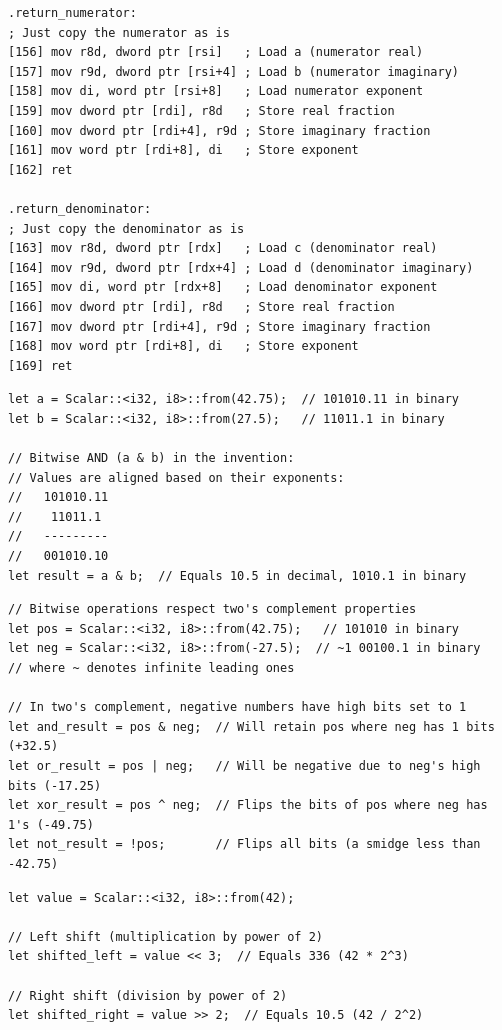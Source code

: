 \documentclass[12pt,letter]{article}
\begin{document}
\begin{lstlisting}[style=rust, caption={Complete Complex Division Assembly Implementation}, label={fig:circle_divide}]
.return_numerator:
; Just copy the numerator as is
[156] mov r8d, dword ptr [rsi]   ; Load a (numerator real)
[157] mov r9d, dword ptr [rsi+4] ; Load b (numerator imaginary)
[158] mov di, word ptr [rsi+8]   ; Load numerator exponent
[159] mov dword ptr [rdi], r8d   ; Store real fraction
[160] mov dword ptr [rdi+4], r9d ; Store imaginary fraction
[161] mov word ptr [rdi+8], di   ; Store exponent
[162] ret

.return_denominator:
; Just copy the denominator as is
[163] mov r8d, dword ptr [rdx]   ; Load c (denominator real)
[164] mov r9d, dword ptr [rdx+4] ; Load d (denominator imaginary)
[165] mov di, word ptr [rdx+8]   ; Load denominator exponent
[166] mov dword ptr [rdi], r8d   ; Store real fraction
[167] mov dword ptr [rdi+4], r9d ; Store imaginary fraction
[168] mov word ptr [rdi+8], di   ; Store exponent
[169] ret
\end{lstlisting}

\newpage
\begin{lstlisting}[style=rust, caption={Scalar Bitwise AND Example in Rust}, label={fig:scalar_bitwise_example}]
let a = Scalar::<i32, i8>::from(42.75);  // 101010.11 in binary
let b = Scalar::<i32, i8>::from(27.5);   // 11011.1 in binary

// Bitwise AND (a & b) in the invention:
// Values are aligned based on their exponents:
//   101010.11
//    11011.1
//   ---------
//   001010.10
let result = a & b;  // Equals 10.5 in decimal, 1010.1 in binary
\end{lstlisting}

\begin{lstlisting}[style=rust, caption={Scalar Bitwise Operations with Signs in Rust}, label={fig:scalar_bitwise_signs}]
// Bitwise operations respect two's complement properties
let pos = Scalar::<i32, i8>::from(42.75);   // 101010 in binary
let neg = Scalar::<i32, i8>::from(-27.5);  // ~1 00100.1 in binary
// where ~ denotes infinite leading ones

// In two's complement, negative numbers have high bits set to 1
let and_result = pos & neg;  // Will retain pos where neg has 1 bits (+32.5)
let or_result = pos | neg;   // Will be negative due to neg's high bits (-17.25)
let xor_result = pos ^ neg;  // Flips the bits of pos where neg has 1's (-49.75)
let not_result = !pos;       // Flips all bits (a smidge less than -42.75)
\end{lstlisting}

\begin{lstlisting}[style=rust, caption={Scalar Bit Shift Operations in Rust}, label={fig:scalar_shifts}]
let value = Scalar::<i32, i8>::from(42);

// Left shift (multiplication by power of 2)
let shifted_left = value << 3;  // Equals 336 (42 * 2^3)

// Right shift (division by power of 2)
let shifted_right = value >> 2;  // Equals 10.5 (42 / 2^2)
\end{lstlisting}
\end{document}
